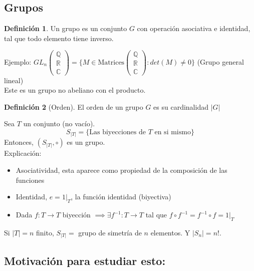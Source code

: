 \documentclass[11pt]{book}
\theoremstyle{definition}
\newtheorem{defn}{Definición}[section]
\begin{document}
\subsection{Grupos}
\begin{defn}
Un grupo es un conjunto $G$ con operación asociativa e identidad, tal que todo elemento tiene inverso.
\end{defn}
Ejemplo:  $GL_n\begin{pmatrix}\mathbb{Q} \\ \mathbb{R} \\ \mathbb{C} \end{pmatrix}=\{M\in\textrm{Matrices}\begin{pmatrix}\mathbb{Q} \\ \mathbb{R} \\ \mathbb{C} \end{pmatrix}:det(M)\neq 0\}$ (Grupo general lineal)\\
Este es un grupo no abeliano con el producto.\\

\begin{defn}[Orden]
El orden de un grupo $G$ es su cardinalidad $|G|$
\end{defn}
Sea $T$ un conjunto (no vací­o).\\
\[
S_{|T|}=\{\textrm{Las biyecciones de } T \textrm{ en si mismo}\}
\]
Entonces, $(S_{|T|},\circ)$ es un grupo.\\
Explicación:\\
\begin{itemize}
	\item Asociatividad, esta aparece como propiedad de la composición de las funciones
	
	\item Identidad, $e=1|_T$, la función identidad (biyectiva)
	
	\item Dada $f:T\rightarrow T$ biyección $\implies \exists f^{-1}:T\rightarrow T$ tal que $f\circ f^{-1}=f^{-1}\circ f=1|_T$
\end{itemize}

Si $|T|=n$ finito, $S_{|T|}=$ grupo de simetrí­a de $n$ elementos. Y $|S_n|=n!$.\\

\subsection{Motivación para estudiar esto:}
\end{document}
